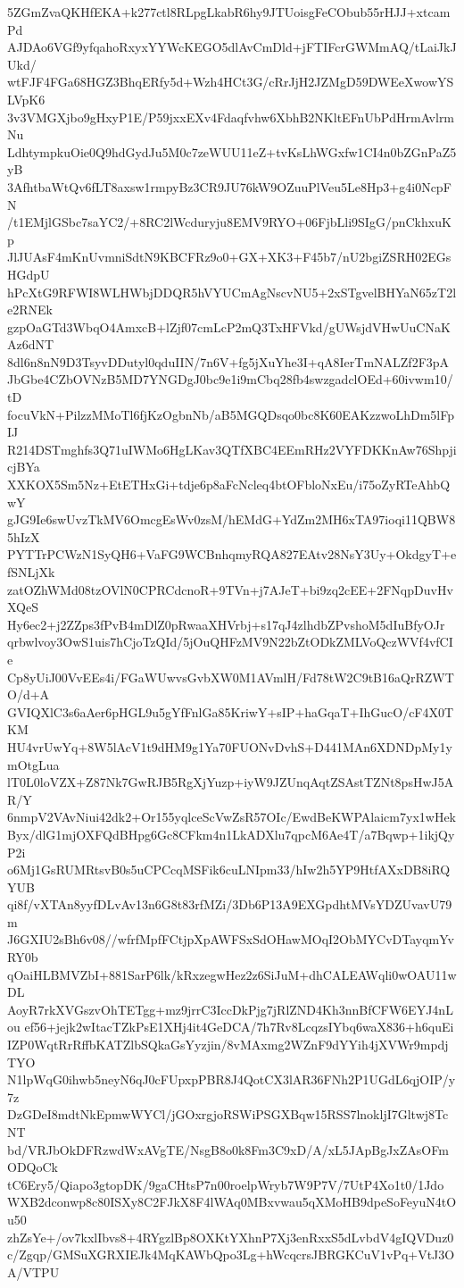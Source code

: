 5ZGmZvaQKHfEKA+k277ctl8RLpgLkabR6hy9JTUoisgFeCObub55rHJJ+xtcamPd
AJDAo6VGf9yfqahoRxyxYYWcKEGO5dlAvCmDld+jFTIFcrGWMmAQ/tLaiJkJUkd/
wtFJF4FGa68HGZ3BhqERfy5d+Wzh4HCt3G/cRrJjH2JZMgD59DWEeXwowYSLVpK6
3v3VMGXjbo9gHxyP1E/P59jxxEXv4Fdaqfvhw6XbhB2NKltEFnUbPdHrmAvlrmNu
LdhtympkuOie0Q9hdGydJu5M0c7zeWUU11eZ+tvKsLhWGxfw1CI4n0bZGnPaZ5yB
3AfhtbaWtQv6fLT8axsw1rmpyBz3CR9JU76kW9OZuuPlVeu5Le8Hp3+g4i0NcpFN
/t1EMjlGSbc7saYC2/+8RC2lWcduryju8EMV9RYO+06FjbLli9SIgG/pnCkhxuKp
JlJUAsF4mKnUvmniSdtN9KBCFRz9o0+GX+XK3+F45b7/nU2bgiZSRH02EGsHGdpU
hPcXtG9RFWI8WLHWbjDDQR5hVYUCmAgNscvNU5+2xSTgvelBHYaN65zT2le2RNEk
gzpOaGTd3WbqO4AmxcB+lZjf07cmLcP2mQ3TxHFVkd/gUWsjdVHwUuCNaKAz6dNT
8dl6n8nN9D3TsyvDDutyl0qduIIN/7n6V+fg5jXuYhe3I+qA8IerTmNALZf2F3pA
JbGbe4CZbOVNzB5MD7YNGDgJ0bc9e1i9mCbq28fb4swzgadclOEd+60ivwm10/tD
focuVkN+PilzzMMoTl6fjKzOgbnNb/aB5MGQDsqo0bc8K60EAKzzwoLhDm5lFpIJ
R214DSTmghfs3Q71uIWMo6HgLKav3QTfXBC4EEmRHz2VYFDKKnAw76ShpjicjBYa
XXKOX5Sm5Nz+EtETHxGi+tdje6p8aFcNcleq4btOFbloNxEu/i75oZyRTeAhbQwY
gJG9Ie6swUvzTkMV6OmcgEsWv0zsM/hEMdG+YdZm2MH6xTA97ioqi11QBW85hIzX
PYTTrPCWzN1SyQH6+VaFG9WCBnhqmyRQA827EAtv28NsY3Uy+OkdgyT+efSNLjXk
zatOZhWMd08tzOVlN0CPRCdcnoR+9TVn+j7AJeT+bi9zq2cEE+2FNqpDuvHvXQeS
Hy6ec2+j2ZZps3fPvB4mDlZ0pRwaaXHVrbj+s17qJ4zlhdbZPvshoM5dIuBfyOJr
qrbwlvoy3OwS1uis7hCjoTzQId/5jOuQHFzMV9N22bZtODkZMLVoQczWVf4vfCIe
Cp8yUiJ00VvEEs4i/FGaWUwvsGvbXW0M1AVmlH/Fd78tW2C9tB16aQrRZWTO/d+A
GVIQXlC3s6aAer6pHGL9u5gYfFnlGa85KriwY+sIP+haGqaT+IhGucO/cF4X0TKM
HU4vrUwYq+8W5lAcV1t9dHM9g1Ya70FUONvDvhS+D441MAn6XDNDpMy1ymOtgLua
lT0L0loVZX+Z87Nk7GwRJB5RgXjYuzp+iyW9JZUnqAqtZSAstTZNt8psHwJ5AR/Y
6nmpV2VAvNiui42dk2+Or155yqlceScVwZsR57OIc/EwdBeKWPAlaicm7yx1wHek
Byx/dlG1mjOXFQdBHpg6Gc8CFkm4n1LkADXlu7qpcM6Ae4T/a7Bqwp+1ikjQyP2i
o6Mj1GsRUMRtsvB0s5uCPCcqMSFik6cuLNIpm33/hIw2h5YP9HtfAXxDB8iRQYUB
qi8f/vXTAn8yyfDLvAv13n6G8t83rfMZi/3Db6P13A9EXGpdhtMVsYDZUvavU79m
J6GXIU2sBh6v08//wfrfMpfFCtjpXpAWFSxSdOHawMOqI2ObMYCvDTayqmYvRY0b
qOaiHLBMVZbI+881SarP6lk/kRxzegwHez2z6SiJuM+dhCALEAWqli0wOAU11wDL
AoyR7rkXVGszvOhTETgg+mz9jrrC3IccDkPjg7jRlZND4Kh3nnBfCFW6EYJ4nLou
ef56+jejk2wItacTZkPsE1XHj4it4GeDCA/7h7Rv8LcqzsIYbq6waX836+h6quEi
IZP0WqtRrRffbKATZlbSQkaGsYyzjin/8vMAxmg2WZnF9dYYih4jXVWr9mpdjTYO
N1lpWqG0ihwb5neyN6qJ0cFUpxpPBR8J4QotCX3lAR36FNh2P1UGdL6qjOIP/y7z
DzGDeI8mdtNkEpmwWYCl/jGOxrgjoRSWiPSGXBqw15RSS7lnokljI7Gltwj8TcNT
bd/VRJbOkDFRzwdWxAVgTE/NsgB8o0k8Fm3C9xD/A/xL5JApBgJxZAsOFmODQoCk
tC6Ery5/Qiapo3gtopDK/9gaCHtsP7n00roelpWryb7W9P7V/7UtP4Xo1t0/1Jdo
WXB2dconwp8c80ISXy8C2FJkX8F4lWAq0MBxvwau5qXMoHB9dpeSoFeyuN4tOu50
zhZsYe+/ov7kxlIbvs8+4RYgzlBp8OXKtYXhnP7Xj3enRxxS5dLvbdV4gIQVDuz0
c/Zgqp/GMSuXGRXIEJk4MqKAWbQpo3Lg+hWcqcrsJBRGKCuV1vPq+VtJ3OA/VTPU
